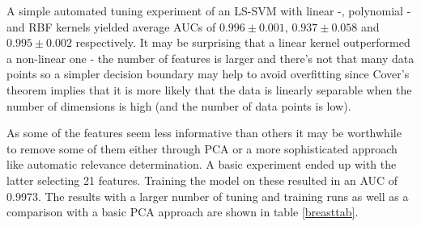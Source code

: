 \par A simple automated tuning experiment of an LS-SVM with linear -, polynomial - and RBF kernels yielded average AUCs of $0.996\pm 0.001$, $0.937\pm 0.058$ and $0.995\pm 0.002$ respectively. It may be surprising that a linear kernel outperformed a non-linear one - the number of features is larger and there's not that many data points so a simpler decision boundary may help to avoid overfitting since Cover's theorem implies that it is more likely that the data is linearly separable when the number of dimensions is high (and the number of data points is low).

\par As some of the features seem less informative than others it may be worthwhile to remove some of them either through PCA or a more sophisticated approach like automatic relevance determination. A basic experiment ended up with the latter selecting 21 features. Training the model on these resulted in an AUC of 0.9973. The results with a larger number of tuning and training runs as well as a comparison with a basic PCA approach are shown in table \ref{breasttab}.

\begin{table}
\begin{tabular}

\end{tabular}
\label{breasttab}
\caption{Mean and standard deviation of accuracy and AUC for linear kernel models after application of PCA or automatic relevance determination (which selected 21 features).}
\end{table}


%

